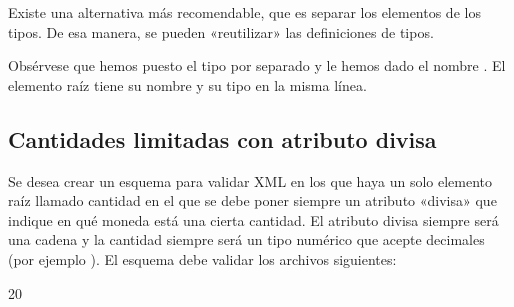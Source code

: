\documentclass[letterpaper,10pt,spanish]{sphinxmanual}
\begin{document}
Existe una alternativa más recomendable, que es separar los elementos de los tipos. De esa manera, se pueden «reutilizar» las definiciones de tipos.

\begin{sphinxVerbatim}[commandchars=\\\{\}]
 
      
     
             
                 
                 
\end{sphinxVerbatim}

Obsérvese que hemos puesto el tipo por separado y le hemos dado el nombre . El elemento raíz tiene su nombre y su tipo en la misma línea.


\subsection{Cantidades limitadas con atributo divisa}
\label{\detokenize{tema5:cantidades-limitadas-con-atributo-divisa}}
Se desea crear un esquema para validar XML en los que haya un solo elemento raíz llamado cantidad en el que se debe poner siempre un atributo «divisa» que indique en qué moneda está una cierta cantidad. El atributo divisa siempre será una cadena y la cantidad siempre será un tipo numérico que acepte decimales (por ejemplo ). El esquema debe validar los archivos siguientes:

\begin{sphinxVerbatim}[commandchars=\\\{\}]
 20
\end{sphinxVerbatim}
\end{document}

